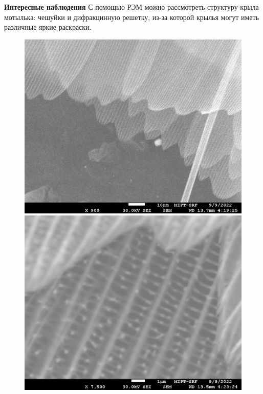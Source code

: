 \documentclass[a4paper,12pt]{article}
\begin{document}
\textbf{Интересные наблюдения}
С помощью РЭМ можно рассмотреть структуру крыла мотылька: чешуйки и дифракцинную решетку, из-за которой крылья могут иметь различные яркие раскраски.
\begin{figure}[h!]
\centering
\begin{minipage}{.5\textwidth}
  \centering
  \includegraphics[width=1\linewidth]{Butterfly001.jpg}
  
\end{minipage}%
\begin{minipage}{.5\textwidth}
  \centering
  \includegraphics[width=1\linewidth]{Butterfly003.jpg}
  
\end{minipage}
\end{figure}
\end{document}
